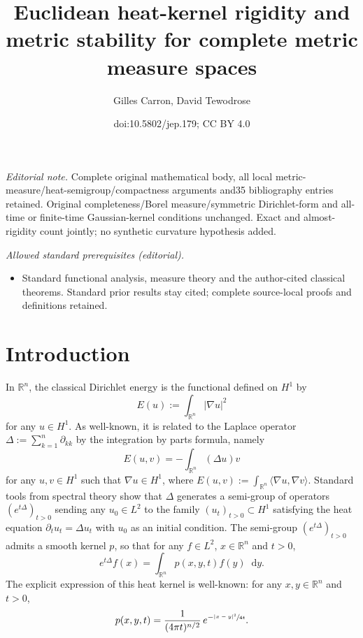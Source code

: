 \documentclass[10pt]{amsart}
\title{Euclidean heat-kernel rigidity and metric stability for complete metric measure spaces}
\author{Gilles Carron, David Tewodrose}
\date{doi:10.5802/jep.179; CC BY 4.0}
\theoremstyle{plain}
\theoremstyle{definition}
\newcommand{\setR}{\mathbb{R}}
\newcommand{\di}{\mathop{}\!\mathrm{d}}
\begin{document}
\maketitle
\noindent\textit{Editorial note.} Complete original mathematical body, all local metric-measure/heat-semigroup/compactness arguments and35 bibliography entries retained. Original completeness/Borel measure/symmetric Dirichlet-form and all-time or finite-time Gaussian-kernel conditions unchanged. Exact and almost-rigidity count jointly; no synthetic curvature hypothesis added.\par\medskip
\noindent\textit{Allowed standard prerequisites (editorial).}\begin{itemize}
\item Standard functional analysis, measure theory and the author-cited classical theorems. Standard prior results stay cited; complete source-local proofs and definitions retained.
\end{itemize}\medskip
\tableofcontents


\section{Introduction}

In $\setR^n$, the classical Dirichlet energy is the functional defined on $H^1$ by
\[
E(u):= \int_{\setR^n} |\nabla u|^2
\]
for any $u \in H^1$. As well-known, it is related to the Laplace operator $\Delta:=\sum_{k=1}^{n}\partial_{kk}$ by the integration by parts formula, namely
\[
E(u,v)=-\int_{\setR^n} (\Delta u) v
\]
for any $u,v \in H^1$ such that $\nabla u\in H^1$, where $E(u,v):=\int_{\setR^n} \langle \nabla u, \nabla v\rangle$. Standard tools from spectral theory show that $\Delta$ generates a semi-group of operators $(e^{t\Delta})_{t>0}$ sending any $u_0 \in L^2$ to the family $(u_t)_{t>0}\subset H^1$ satisfying the heat equation $\partial_t u_t = \Delta u_t$ with $u_0$ as an initial condition. The semi-group $(e^{t\Delta})_{t>0}$ admits a smooth kernel $p$, so that for any $f \in L^2$, $x \in \setR^n$ and $t>0$,
\[
e^{t\Delta} f(x) = \int_{\setR^n} p(x,y,t)f(y) \di y.
\]
The explicit expression of this heat kernel is well-known: for any $x,y \in \setR^n$ and $t>0$,
\[
p(x,y,t) = \frac{1}{(4 \pi t)^{n/2}}\, e^{-\sfrac{|x-y|^2}{4t}}.
\]
\end{document}
